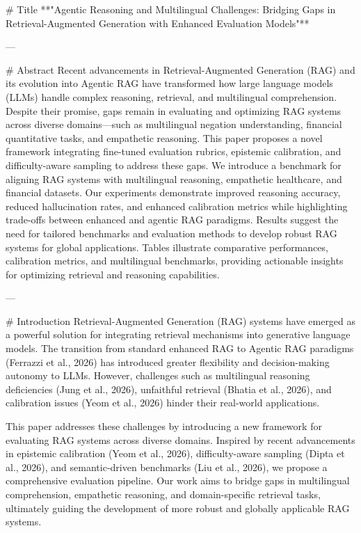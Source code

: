 # Title  
**"Agentic Reasoning and Multilingual Challenges: Bridging Gaps in Retrieval-Augmented Generation with Enhanced Evaluation Models"**

---

# Abstract  
Recent advancements in Retrieval-Augmented Generation (RAG) and its evolution into Agentic RAG have transformed how large language models (LLMs) handle complex reasoning, retrieval, and multilingual comprehension. Despite their promise, gaps remain in evaluating and optimizing RAG systems across diverse domains—such as multilingual negation understanding, financial quantitative tasks, and empathetic reasoning. This paper proposes a novel framework integrating fine-tuned evaluation rubrics, epistemic calibration, and difficulty-aware sampling to address these gaps. We introduce a benchmark for aligning RAG systems with multilingual reasoning, empathetic healthcare, and financial datasets. Our experiments demonstrate improved reasoning accuracy, reduced hallucination rates, and enhanced calibration metrics while highlighting trade-offs between enhanced and agentic RAG paradigms. Results suggest the need for tailored benchmarks and evaluation methods to develop robust RAG systems for global applications. Tables illustrate comparative performances, calibration metrics, and multilingual benchmarks, providing actionable insights for optimizing retrieval and reasoning capabilities.

---

# Introduction  
Retrieval-Augmented Generation (RAG) systems have emerged as a powerful solution for integrating retrieval mechanisms into generative language models. The transition from standard enhanced RAG to Agentic RAG paradigms (Ferrazzi et al., 2026) has introduced greater flexibility and decision-making autonomy to LLMs. However, challenges such as multilingual reasoning deficiencies (Jung et al., 2026), unfaithful retrieval (Bhatia et al., 2026), and calibration issues (Yeom et al., 2026) hinder their real-world applications.

This paper addresses these challenges by introducing a new framework for evaluating RAG systems across diverse domains. Inspired by recent advancements in epistemic calibration (Yeom et al., 2026), difficulty-aware sampling (Dipta et al., 2026), and semantic-driven benchmarks (Liu et al., 2026), we propose a comprehensive evaluation pipeline. Our work aims to bridge gaps in multilingual comprehension, empathetic reasoning, and domain-specific retrieval tasks, ultimately guiding the development of more robust and globally applicable RAG systems.

